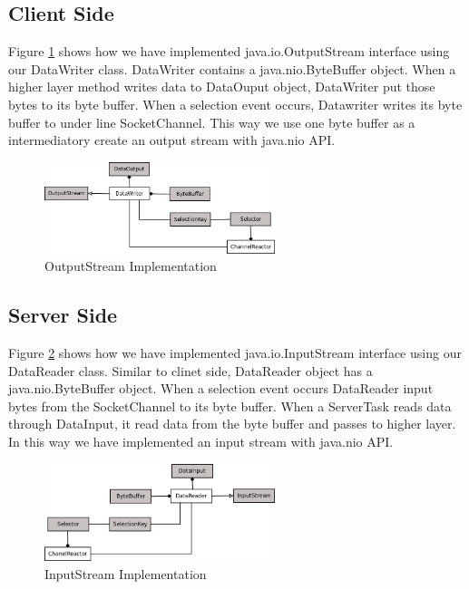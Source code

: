 \subsection{Client Side}
Figure \ref{client} shows how we have implemented java.io.OutputStream interface using our DataWriter class. DataWriter contains a java.nio.ByteBuffer object. When a higher layer method writes data to DataOuput object, DataWriter put those bytes to its byte buffer. When a selection event occurs, Datawriter writes its byte buffer to under line SocketChannel. This way we use one byte buffer as a intermediatory create an output stream with java.nio API.
\begin{figure}
        \centering
        \includegraphics[width=0.6\textwidth]{client.png}
        \caption{OutputStream Implementation}
        \label{client}
\end{figure}
\subsection{Server Side}
Figure \ref{server} shows how we have implemented java.io.InputStream interface using our DataReader class. Similar to clinet side, DataReader object has a java.nio.ByteBuffer object. When a selection event occurs DataReader input bytes from the SocketChannel to its byte buffer. When a ServerTask reads data through DataInput, it read data from the byte buffer and passes to higher layer. In this way we have implemented an input stream with java.nio API.
\begin{figure}
        \centering
        \includegraphics[width=0.6\textwidth]{server.png}
        \caption{InputStream Implementation}
        \label{server}
\end{figure}